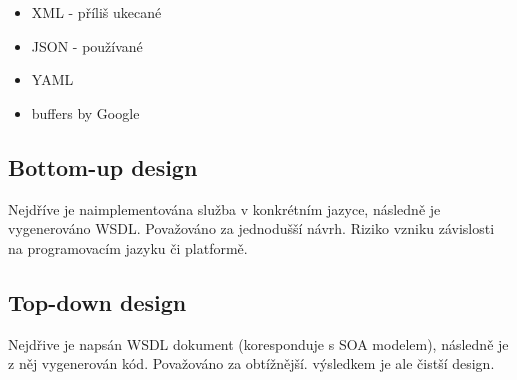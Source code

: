 \begin{itemize}[itemsep=0px]
\item XML - příliš ukecané
\item JSON - používané
\item YAML
\item buffers by Google
\end{itemize}

\subsection{Bottom-up design}
Nejdříve je naimplementována služba v konkrétním jazyce, následně je vygenerováno WSDL. Považováno za jednodušší návrh. Riziko vzniku závislosti na programovacím jazyku či platformě.

\subsection{Top-down design}
Nejdřive je napsán WSDL dokument (koresponduje s SOA modelem), následně je z něj vygenerován kód. Považováno za obtížnější. výsledkem je ale čistší design.
